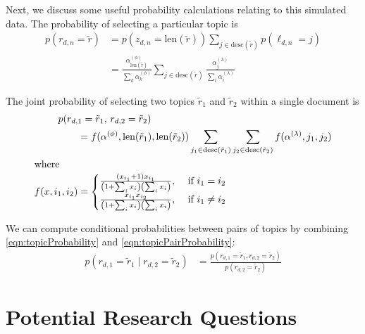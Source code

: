 \documentclass{article}
\newcommand{\len}{\text{len}}
\begin{document}
Next, we discuss some useful probability calculations relating to this simulated data.
The probability of selecting a particular topic is
\begin{align}
p(r_{d,n} = \tilde r)
&= p(z_{d,n} = \len(\tilde r)) \sum_{j \in \text{desc}(\tilde r)} p(\ell_{d,n} = j) \\
&= \frac{\alpha^{(\phi)}_{\len(\tilde r)}}{\sum_k \alpha^{(\phi)}_k} \sum_{j \in \text{desc}(\tilde r)} \frac{\alpha^{(\lambda)}_j}{\sum_i \alpha^{(\lambda)}_i} \label{eqn:topicProbability}
\end{align}

The joint probability of selecting two topics $\tilde r_1$ and $\tilde r_2$ within a single document is
\begin{align}
\MoveEqLeft
p(r_{d,1} = \tilde r_1, \, r_{d,2} = \tilde r_2) \nonumber \\
&= f(\alpha^{(\phi)}, \len(\tilde r_1), \len(\tilde r_2))
  \sum_{j_1 \in \text{desc}(\tilde r_1)}
  \sum_{j_2 \in \text{desc}(\tilde r_2)}
    f(\alpha^{(\lambda)}, j_1, j_2) \label{eqn:topicPairProbability} \\
\intertext{where}
f(x, i_1, i_2)
&=
\begin{cases}
  \frac{(x_{i_1} + 1) x_{i_1}}{\left(1 + \sum_i x_i\right) \left(\sum_i x_i\right)}, &\text{ if } i_1 = i_2 \\
  \frac{x_{i_1} x_{i_2}}{\left(1 + \sum_i x_i\right) \left(\sum_i x_i\right)}, &\text{ if } i_1 \neq i_2
\end{cases}
\end{align}

We can compute conditional probabilities between pairs of topics by combining \eqref{eqn:topicProbability} and \eqref{eqn:topicPairProbability}:
\begin{align}
p(r_{d,1} = \tilde r_1 \mid r_{d,2} = \tilde r_2)
&= \frac{ p(r_{d,1} = \tilde r_1, r_{d,2} = \tilde r_2) }{ p(r_{d,2} = \tilde r_2) }
\end{align}

\section{Potential Research Questions}
\end{document}
